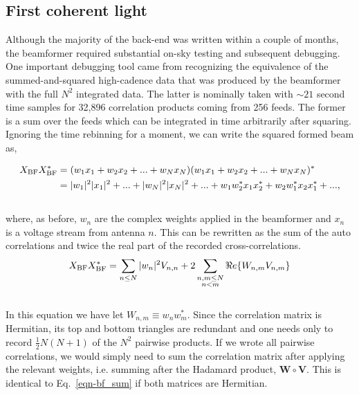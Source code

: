 \subsection{First coherent light}
Although the majority of the back-end was written within a couple  
of months, the beamformer required substantial 
on-sky testing and subsequent debugging. One important debugging tool 
came from recognizing the equivalence of the summed-and-squared
high-cadence data that was produced by the beamformer with the 
full $N^2$ integrated data. The latter is nominally taken with $\sim21$ second
time samples for 32,896 correlation products coming from 256 feeds. 
The former is a sum over the feeds which can be integrated in time 
arbitrarily after squaring. Ignoring the time rebinning for a moment,
we can write the squared formed beam as,

\begin{align}
X_{\rm BF} X_{\rm BF}^* &= (w_1 x_1 + w_2 x_2 + ... + w_N x_N) (w_1 x_1 + w_2 x_2 + ... + w_N x_N)^*\\
&= |w_1|^2|x_1|^2 + ... + |w_N|^2|x_N|^2 + ... + w_1 w_2^* x_1 x_2^* + w_2 w_1^* x_2 x_1^* + ... , 
\end{align}
\\

\noindent where, as before, $w_n$ are the 
complex weights applied in the beamformer 
and $x_n$ is a voltage stream from antenna $n$.
This can be rewritten as the sum of the 
auto correlations and twice the real part of the recorded cross-correlations.
\\

\begin{equation}
\label{eqn-bf_sum}
X_{\rm BF} X_{\rm BF}^* = \sum_{n\le N} |w_n|^2 V_{n, n} + 
2 \sum_{\substack{n,m\le N \\ n<m}} \Re e\{W_{n, m} V_{n, m}\}
\end{equation}
\\

In this equation we have let $W_{n, m} \equiv w_n w_m^*$.
Since the correlation matrix is Hermitian, its top 
and bottom triangles are redundant and one needs only to 
record $\frac{1}{2} N (N+1)$ of the $N^2$ pairwise products.
If we wrote all pairwise correlations, we would simply need 
to sum the correlation matrix after applying the relevant 
weights, i.e. summing after the Hadamard
product, $\mathbf{W} \circ \mathbf{V}$. This is identical 
to Eq.~\ref{eqn-bf_sum} if both matrices are Hermitian. 

